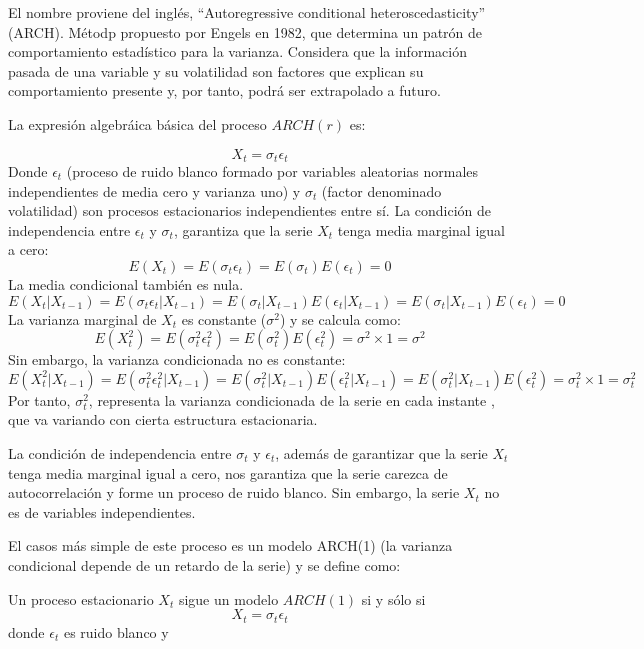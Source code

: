 \documentclass[
  a4paper,
  oneside,
  openany]{book}
\begin{document}
El nombre proviene del inglés, ``Autoregressive conditional heteroscedasticity'' (ARCH). Métodp propuesto por Engels en 1982, que determina un patrón de comportamiento estadístico para la varianza. Considera que la información pasada de una variable y su volatilidad son factores que explican su comportamiento presente y, por tanto, podrá ser extrapolado a futuro.

La expresión algebráica básica del proceso \(ARCH(r)\) es:

\[
X_t=\sigma_{t}\epsilon_{t}
\]
Donde \(\epsilon_{t}\) (proceso de ruido blanco formado por variables aleatorias normales independientes de media cero y varianza uno) y \(\sigma_{t}\) (factor denominado volatilidad) son procesos estacionarios independientes entre sí.
La condición de independencia entre \(\epsilon_{t}\) y \(\sigma_{t}\), garantiza que la serie \(X_t\) tenga media marginal igual a cero:
\[
E(X_{t})=E(\sigma_{t}\epsilon_{t})=E(\sigma_{t})E(\epsilon_{t})=0
\]
La media condicional también es nula.
\[
E(X_{t}|X_{t-1})=E(\sigma_{t}\epsilon_{t}|X_{t-1})=E(\sigma_{t}|X_{t-1})E(\epsilon_{t}|X_{t-1})=E(\sigma_{t}|X_{t-1})E(\epsilon_{t})=0
\]
La varianza marginal de \(X_{t}\) es constante (\(\sigma^2\)) y se calcula como:
\[
E(X_{t}^2)=E(\sigma_{t}^2\epsilon_{t}^2)=E(\sigma_{t}^2)E(\epsilon_{t}^2)=\sigma^2\times1=\sigma^2
\]
Sin embargo, la varianza condicionada no es constante:
\[
E(X_{t}^2|X_{t-1})=E(\sigma_{t}^2\epsilon_{t}^2|X_{t-1})=E(\sigma_{t}^2|X_{t-1})E(\epsilon_{t}^2|X_{t-1})=E(\sigma_{t}^2|X_{t-1})E(\epsilon_{t}^2)=\sigma_t^2\times1=\sigma_t^2
\]
Por tanto, \(\sigma_t^2\), representa la varianza condicionada de la serie en cada instante , que va variando con cierta estructura estacionaria.

La condición de independencia entre \(\sigma_t\) y \(\epsilon_t\), además de garantizar que la serie \(X_t\) tenga media marginal igual a cero, nos garantiza que la serie carezca de autocorrelación y forme un proceso de ruido blanco. Sin embargo, la serie \(X_t\) no es de variables independientes.

El casos más simple de este proceso es un modelo ARCH(1) (la varianza condicional depende de un retardo de la serie) y se define como:

Un proceso estacionario \(X_t\) sigue un modelo \(ARCH(1)\) si y sólo si
\[
X_t=\sigma_t\epsilon_t
\]
donde \(\epsilon_t\) es ruido blanco y
\end{document}
